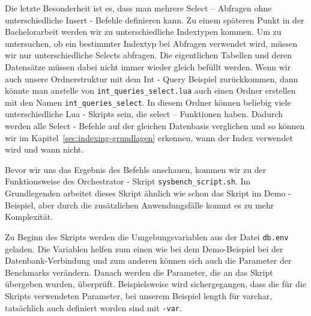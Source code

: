 \label{itm:mehrere_selects}
Die letzte Besonderheit ist es, dass man mehrere Select – Abfragen ohne unterschiedliche Insert - Befehle definieren kann.
Zu einem späteren Punkt in der Bachelorarbeit werden wir zu unterschiedliche Indextypen kommen.
Um zu untersuchen, ob ein bestimmter Indextyp bei Abfragen verwendet wird, müssen wir nur unterschiedliche Selects abfragen.
Die eigentlichen Tabellen und deren Datensätze müssen dabei nicht immer wieder gleich befüllt werden.
Wenn wir auch unsere Ordnerstruktur mit dem Int - Query Beispiel zurückkommen, dann könnte man anstelle von \texttt{int\_queries\_select.lua} auch einen Ordner erstellen mit den Namen \texttt{int\_queries\_select}.
In diesem Ordner können beliebig viele unterschiedliche Lua - Skripts sein, die select – Funktionen haben.
Dadurch werden alle Select - Befehle auf der gleichen Datenbasis verglichen und so können wir im Kapitel~\ref{sec:indexing-grundlagen} erkennen, wann der Index verwendet wird und wann nicht.

Bevor wir uns das Ergebnis des Befehls anschauen, kommen wir zu der Funktionsweise des Orchestrator - Skript \texttt{sysbench\_script.sh}.
Im Grundlegenden arbeitet dieses Skript ähnlich wie schon das Skript im Demo - Beispiel, aber durch die zusätzlichen Anwendungsfälle kommt es zu mehr Komplexität.

Zu Beginn des Skripts werden die Umgebungsvariablen aus der Datei \texttt{db.env} geladen.
Die Variablen helfen zum einen wie bei dem Demo-Beispiel bei der Datenbank-Verbindung und zum anderen können sich auch die Parameter der Benchmarks verändern.
Danach werden die Parameter, die an das Skript übergeben wurden, überprüft.
Beispielsweise wird sichergegangen, dass die für die Skripts verwendeten Parameter, bei unserem Beispiel length für varchar, tatsächlich auch definiert worden sind mit \texttt{-var}.

